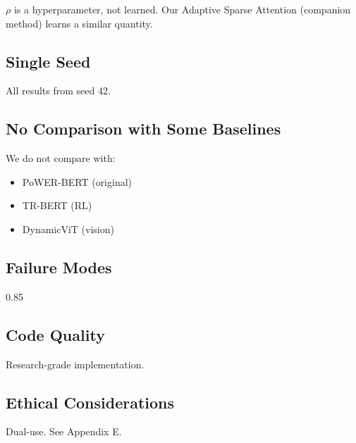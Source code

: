 $\rho$ is a hyperparameter, not learned. Our Adaptive Sparse Attention 
(companion method) learns a similar quantity.

\subsection{Single Seed}

All results from seed 42.

\subsection{No Comparison with Some Baselines}

We do not compare with:
\begin{itemize}
\item PoWER-BERT (original)
\item TR-BERT (RL)
\item DynamicViT (vision)

\end{itemize}
\subsection{Failure Modes}

0.85

\subsection{Code Quality}

Research-grade implementation.

\subsection{Ethical Considerations}

Dual-use. See Appendix E.

